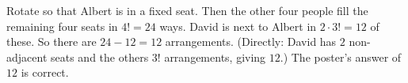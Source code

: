 Rotate so that Albert is in a fixed seat. Then the other four people fill the remaining four seats in $4!=24$ ways. David is next to Albert in $2\cdot3!=12$ of these. So there are $24-12=\boxed{12}$ arrangements. (Directly: David has $2$ non-adjacent seats and the others $3!$ arrangements, giving $12$.) The poster's answer of $12$ is correct.
